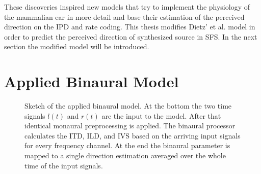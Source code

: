 These discoveries inspired new models that try to implement the
physiology of the mammalian ear in more detail and base their estimation of the
perceived direction on the \ac{IPD} and rate
coding.
This thesis modifies Dietz' et al.\autocite{Dietz2011} model in order to predict
the perceived direction of synthesized source in \ac{SFS}.
In the next section the modified model will be introduced.


\section{Applied Binaural Model}
\label{sec:applied_binaural_model}
%
\begin{figure}
    \small
    \centering
    
    \caption{Sketch of the applied binaural model.
    At the bottom the two time signals $l(t)$ and $r(t)$ are the input to the
    model. After that identical monaural preprocessing is applied. The binaural
    processor calculates the \ac{ITD}, \ac{ILD}, and \ac{IVS} based on the
    arriving input signals for every frequency channel. At the end the binaural
    parameter is mapped to a single direction estimation averaged over the whole
    time of the input signals.
    \label{fig:sketch_dietz_model}}
\end{figure}
%

